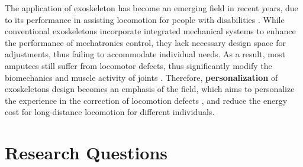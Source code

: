 \documentclass{article}
\begin{document}
The application of exoskeleton has become an emerging field in recent years, due to its performance in assisting locomotion for people with disabilities \cite{PersonalizeMain}. While conventional exoskeletons incorporate integrated mechanical systems to enhance the performance of mechatronics control, they lack necessary design space for adjustments, thus failing to accommodate individual needs. As a result, most amputees still suffer from locomotor defects, thus significantly modify the biomechanics and muscle activity of joints \cite{GaitAdjustment}. Therefore, \textbf{personalization} of exoskeletons design becomes an emphasis of the field, which aims to personalize the experience in the correction of locomotion defects \cite{GaitCorrection}, and reduce the energy cost for long-distance locomotion \cite{ReduceEnergyCost} for different individuals.


\section{Research Questions}

    

\end{document}
